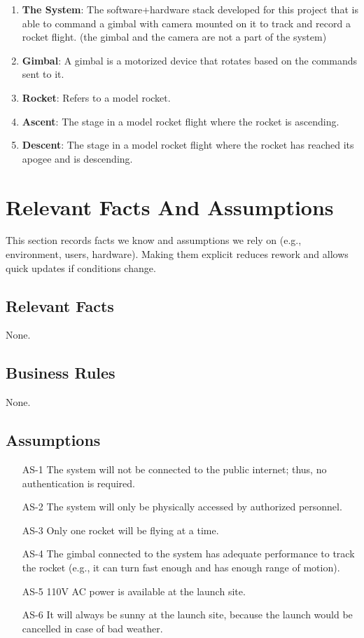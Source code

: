 \documentclass[12pt]{article}
\begin{document}
\begin{enumerate}
  \item \textbf{The System}: The software+hardware stack developed for this project that is able to command a gimbal with camera mounted on it to track and record a rocket flight. (the gimbal and the camera are not a part of the system)
  \item \textbf{Gimbal}: A gimbal is a motorized device that rotates based on the commands sent to it.
  \item \textbf{Rocket}: Refers to a model rocket.
  \item \textbf{Ascent}: The stage in a model rocket flight where the rocket is ascending.
  \item \textbf{Descent}: The stage in a model rocket flight where the rocket has reached its apogee and is descending.
\end{enumerate}

\section{Relevant Facts And Assumptions}
This section records facts we know and assumptions we rely on (e.g., environment, users, hardware).
Making them explicit reduces rework and allows quick updates if conditions change.

\subsection{Relevant Facts}

None.

\subsection{Business Rules}

None.

\subsection{Assumptions}

\begin{itemize}[leftmargin=*]
  \item[AS-1] The system will not be connected to the public internet; thus, no
        authentication is required.
  \item[AS-2] The system will only be physically accessed by authorized personnel.
  \item[AS-3] Only one rocket will be flying at a time.
  \item[AS-4] The gimbal connected to the system has adequate performance to track the
        rocket (e.g., it can turn fast enough and has enough range of motion).
  \item[AS-5] 110V AC power is available at the launch site.
  \item[AS-6] It will always be sunny at the launch site, because the launch would be
        cancelled in case of bad weather.
\end{itemize}
\end{document}
